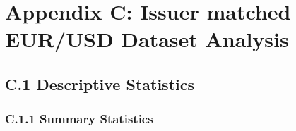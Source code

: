 %
%

\chapter{Appendix C: Issuer matched EUR/USD Dataset Analysis}
\label{appC}

\section{C.1 Descriptive Statistics}

\subsection{C.1.1 Summary Statistics}

